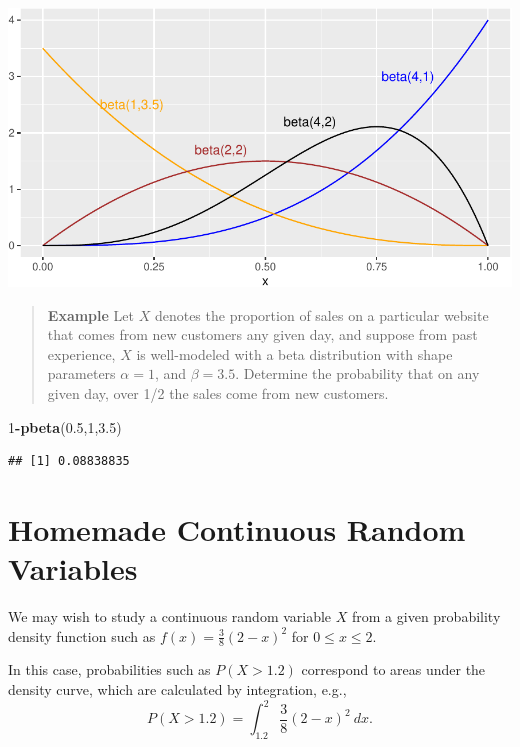 \documentclass[
]{book}
\newenvironment{Shaded}{\begin{snugshade}}{\end{snugshade}}
\newcommand{\DecValTok}[1]{\textcolor[rgb]{0.00,0.00,0.81}{#1}}
\newcommand{\FloatTok}[1]{\textcolor[rgb]{0.00,0.00,0.81}{#1}}
\newcommand{\FunctionTok}[1]{\textcolor[rgb]{0.13,0.29,0.53}{\textbf{#1}}}
\newcommand{\NormalTok}[1]{#1}
\newcommand{\SpecialCharTok}[1]{\textcolor[rgb]{0.81,0.36,0.00}{\textbf{#1}}}
\theoremstyle{definition}
\theoremstyle{definition}
\theoremstyle{definition}
\theoremstyle{definition}
\theoremstyle{remark}
\begin{document}
\begin{center}\includegraphics{math340-notes_files/figure-latex/unnamed-chunk-190-1} \end{center}

\begin{quote}
\textbf{Example} Let \(X\) denotes the proportion of sales on a particular website that comes from new customers any given day, and suppose from past experience, \(X\) is well-modeled with a beta distribution with shape parameters \(\alpha = 1\), and \(\beta=3.5\). Determine the probability that on any given day, over 1/2 the sales come from new customers.
\end{quote}

\begin{Shaded}
\begin{Highlighting}[]
\DecValTok{1}\SpecialCharTok{{-}}\FunctionTok{pbeta}\NormalTok{(}\FloatTok{0.5}\NormalTok{,}\DecValTok{1}\NormalTok{,}\FloatTok{3.5}\NormalTok{)}
\end{Highlighting}
\end{Shaded}

\begin{verbatim}
## [1] 0.08838835
\end{verbatim}

\section{Homemade Continuous Random Variables}\label{customR}

We may wish to study a continuous random variable \(X\) from a given probability density function such as \(f(x) = \frac{3}{8}(2-x)^2\) for \(0 \leq x \leq 2\).

In this case, probabilities such as \(P(X > 1.2)\) correspond to areas under the density curve, which are calculated by integration, e.g., \[P(X > 1.2) = \int_{1.2}^2 \frac{3}{8}(2-x)^2~dx.\]
\end{document}

